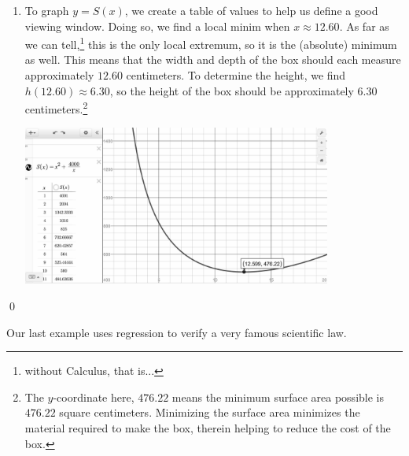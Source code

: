 \begin{ex}
\begin{enumerate}
\item   To graph $y = S(x)$, we create a table of values to help us define a good viewing window.  Doing so, we find a local minim when $x \approx 12.60$.  As far as we can tell,\footnote{without Calculus, that is...} this is the only local extremum, so it is the (absolute) minimum as well. This means that the width and depth of the box should each measure approximately $12.60$ centimeters.  To determine the height, we find $h(12.60) \approx 6.30$, so the height of the box should be approximately $6.30$ centimeters.\footnote{The $y$-coordinate here, $476.22$ means the minimum surface area possible is $476.22$ square centimeters.  Minimizing the surface area minimizes the material required to make the box, therein helping to reduce the cost of the box.}

\begin{center}


\includegraphics[width=4in]{./RationalIneqGraphics/RatIneqEx04.jpg} 


\end{center} 

\end{enumerate}
\qed

\end{ex}

Our last example uses regression to verify a very famous scientific law.

